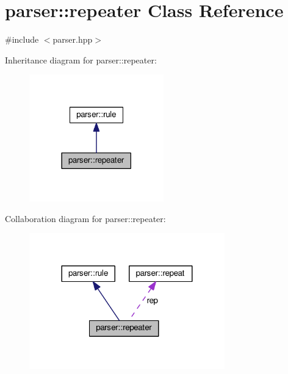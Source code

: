 \hypertarget{classparser_1_1repeater}{}\section{parser\+:\+:repeater Class Reference}
\label{classparser_1_1repeater}


{\ttfamily \#include $<$parser.\+hpp$>$}



Inheritance diagram for parser\+:\+:repeater\+:
\nopagebreak
\begin{figure}[H]
\begin{center}
\leavevmode
\includegraphics[width=165pt]{classparser_1_1repeater__inherit__graph}
\end{center}
\end{figure}


Collaboration diagram for parser\+:\+:repeater\+:
\nopagebreak
\begin{figure}[H]
\begin{center}
\leavevmode
\includegraphics[width=240pt]{classparser_1_1repeater__coll__graph}
\end{center}
\end{figure}
